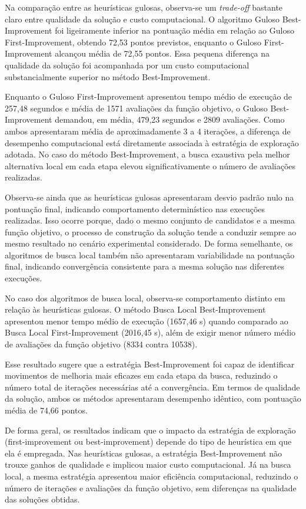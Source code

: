 Na comparação entre as heurísticas gulosas, observa-se um \textit{trade-off} 
bastante claro entre qualidade da solução e custo computacional. 
O algoritmo Guloso Best-Improvement foi ligeiramente inferior na pontuação média em 
relação ao Guloso First-Improvement, obtendo 72,53 pontos previstos, enquanto o 
Guloso First-Improvement alcançou média de 72,55 pontos. Essa pequena 
diferença na qualidade da solução foi acompanhada por um custo computacional 
substancialmente superior no método Best-Improvement.

Enquanto o Guloso First-Improvement apresentou tempo médio de execução de 257,48 
segundos e média de 1571 avaliações da função objetivo, o Guloso Best-Improvement 
demandou, em média, 479,23 segundos e 2809 avaliações. Como ambos apresentaram média de 
aproximadamente 3 a 4 iterações, a diferença de desempenho computacional está 
diretamente associada à estratégia de exploração adotada. No caso do método 
Best-Improvement, a busca exaustiva pela melhor alternativa local em cada etapa elevou 
significativamente o número de avaliações realizadas.

Observa-se ainda que as heurísticas gulosas apresentaram desvio padrão nulo 
na pontuação final, indicando comportamento determinístico nas execuções realizadas. 
Isso ocorre porque, dado o mesmo conjunto de candidatos e a mesma função objetivo, 
o processo de construção da solução tende a conduzir sempre ao mesmo resultado no 
cenário experimental considerado. De forma semelhante, os algoritmos de busca local 
também não apresentaram variabilidade na pontuação final, indicando convergência 
consistente para a mesma solução nas diferentes execuções.

No caso dos algoritmos de busca local, observa-se comportamento distinto em 
relação às heurísticas gulosas. O método Busca Local Best-Improvement apresentou 
menor tempo médio de execução (1657,46 s) quando comparado ao Busca Local 
First-Improvement (2016,45 s), além de exigir menor número médio de avaliações da 
função objetivo (8334 contra 10538).

Esse resultado sugere que a estratégia Best-Improvement foi capaz de identificar 
movimentos de melhoria mais eficazes em cada etapa da busca, reduzindo o número 
total de iterações necessárias até a convergência. Em termos de qualidade da solução, 
ambos os métodos apresentaram desempenho idêntico, com pontuação média de 74,66 pontos.

De forma geral, os resultados indicam que o impacto da estratégia de exploração 
(first-improvement ou best-improvement) depende do tipo de heurística em que ela é 
empregada. Nas heurísticas gulosas, a estratégia Best-Improvement não trouxe ganhos 
de qualidade e implicou maior custo computacional. Já na busca local, a mesma estratégia 
apresentou maior eficiência computacional, reduzindo o número de iterações e avaliações 
da função objetivo, sem diferenças na qualidade das soluções obtidas.

